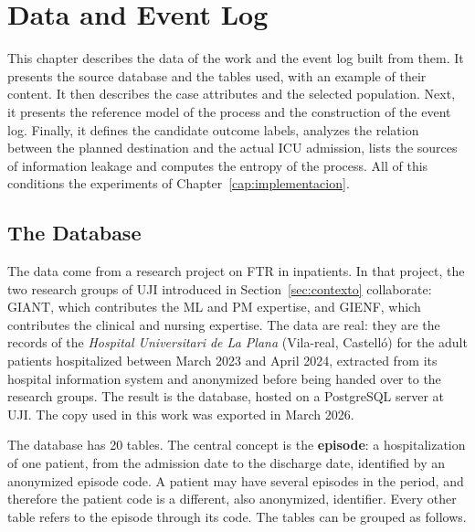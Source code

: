 \chapter{Data and Event Log}
\label{cap:datos}

This chapter describes the data of the work and the event log built from them. It presents the source database and the tables used, with an example of their content. It then describes the case attributes and the selected population. Next, it presents the reference model of the process and the construction of the event log. Finally, it defines the candidate outcome labels, analyzes the relation between the planned destination and the actual ICU admission, lists the sources of information leakage and computes the entropy of the process. All of this conditions the experiments of Chapter~\ref{cap:implementacion}.

\section{The  Database}
\label{sec:bd}

The data come from a research project on FTR in inpatients. In that project, the two research groups of UJI introduced in Section~\ref{sec:contexto} collaborate: GIANT, which contributes the ML and PM expertise, and GIENF, which contributes the clinical and nursing expertise. The data are real: they are the records of the \emph{Hospital Universitari de La Plana} (Vila-real, Castell\'o) for the adult patients hospitalized between March 2023 and April 2024, extracted from its hospital information system and anonymized before being handed over to the research groups. The result is the  database, hosted on a PostgreSQL server at UJI. The copy used in this work was exported in March 2026.

The database has 20 tables. The central concept is the \textbf{episode}: a hospitalization of one patient, from the admission date to the discharge date, identified by an anonymized episode code. A patient may have several episodes in the period, and therefore the patient code is a different, also anonymized, identifier. Every other table refers to the episode through its code. The tables can be grouped as follows.

